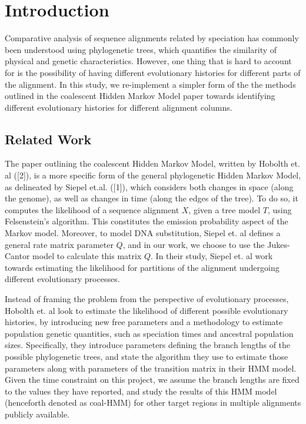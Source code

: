 \documentclass[12pt]{article}
\begin{document}
    \setlength{\parindent}{5ex}
    \addtolength{\parskip}{0.1cm}
    \setlength{\fboxrule}{.5mm}\setlength{\fboxsep}{1.2mm}
    \newlength{\boxlength}\setlength{\boxlength}{\textwidth}
    \addtolength{\boxlength}{-4mm}
    \begin{center}
    \end{center}
    \section{Introduction}
    Comparative analysis of sequence alignments related by speciation has commonly been understood
    using phylogenetic trees, which quantifies the similarity of physical and genetic
    characteristics. However, one thing that is hard to account for is the possibility of having different evolutionary histories for different parts of the alignment. In this study, we re-implement a simpler form of the the methods outlined in the coalescent Hidden Markov Model paper towards identifying different evolutionary histories for different alignment columns.
    \subsection{Related Work}
    The paper outlining the coalescent Hidden Markov Model, written by Hobolth et. al ([2]), is a more specific form of the general phylogenetic Hidden Markov Model, as delineated by Siepel et.al. ([1]), which considers both changes in space (along the genome), as well as changes in time (along the edges of the tree). To do so, it computes the likelihood of a sequence alignment $X$, given a tree model $T$, using Felsenstein's algorithm. This constitutes the emission probability aspect of the Markov model. Moreover, to model DNA substitution, Siepel et. al defines a general rate matrix parameter $Q$, and in our work, we choose to use the Jukes-Cantor model to calculate this matrix $Q$. In their study, Siepel et. al work towards estimating the likelihood for partitions of the alignment undergoing different evolutionary processes.

    Instead of framing the problem from the perspective of evolutionary processes, Hobolth et. al look to estimate the likelihood of different possible evolutionary histories, by introducing new free parameters and a methodology to estimate population genetic quantities, such as speciation times and ancestral population sizes. Specifically, they introduce parameters defining the branch lengths of the possible phylogenetic trees, and state the algorithm they use to estimate those parameters along with parameters of the transition matrix in their HMM model. Given the time constraint on this project, we assume the branch lengths are fixed to the values they have reported, and study the results of this HMM model (henceforth denoted as coal-HMM) for other target regions in multiple alignments publicly available.
\end{document}
